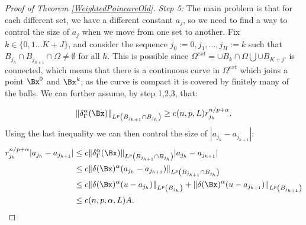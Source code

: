 \begin{proof}[Proof of Theorem \ref{WeightedPoincareOld}]
\textit{Step 5:} The main problem is that for each different set, we have a different constant $a_j$, so we need to find a way to control the size of $a_j$ when we move from one set to another. Fix $k\in \{0,1\ldots K+J\}$, and consider the sequence $j_0:=0, j_1, \ldots, j_H:=k$ such that $B_{j_h} \cap B_{j_{h+1}} \cap \Omega \neq \emptyset$ for all $h$. This is possible since $\Omega^{ext}=\cup B_k\cap \Omega\bigcup\cup B_{K+j'}$ is connected, which means that there is a continuous curve in $\Omega^{ext}$ which joins a point $\Bx^0$ and $\Bx^k$; as the curve is compact it is covered by finitely many of the balls. We can further assume, by step 1,2,3,  that:

$$  \|\delta_\GG^\alpha(\Bx)\|_{L^p \left(B_{j_{h+1}} \cap B_{j_{h}}\right)}\geq c(n,p,L) r_{j_h}^{n/p+\alpha }.$$
Using the last inequality we can then control the size of $|a_{j_{h}}-a_{j_{h+1}}|$:
\begin{align*}
    r_{j_h}^{n / p+\alpha}|a_{j_{h}}-a_{j_{h+1}}| &\leq
    c \|\delta_\GG^\alpha(\Bx)\|_{L^p \left(B_{j_{h+1}} \cap B_{j_{h}}\right)}|a_{j_{h}}-a_{j_{h+1}}|\\
    &\leq c\|\delta(\Bx)^\alpha(a_{j_{h}}-a_{j_{h+1}})\|_{L^p \left(B_{j_{h+1}} \cap B_{j_{h}}\right)}\\
    &\leq c \|\delta(\Bx)^\alpha(u-a_{j_{h}})\|_{L^p \left(  B_{j_{h}}\right)}+ \|\delta(\Bx)^\alpha(u-a_{j_{h+1}})\|_{L^p \left(B_{j_{h+1}}\right)}\\
    & \leq c(n,p,\alpha,L) A.
\end{align*}




\end{proof}
